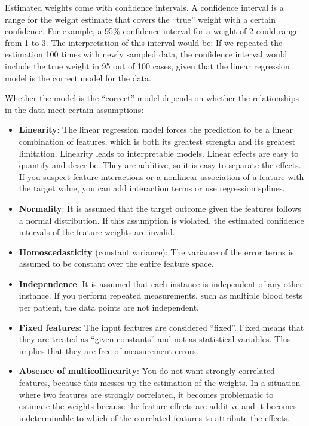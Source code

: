 Estimated weights come with confidence intervals. A confidence interval is a range for the weight estimate that covers the “true” weight with a certain confidence. For example, a 95\% confidence interval for a weight of 
2 could range from 1 to 3. The interpretation of this interval would be: If we repeated the estimation 100 times with newly sampled data, the confidence interval would include the true weight in 95 out of 100 cases, given 
that the linear regression model is the correct model for the data.

Whether the model is the “correct” model depends on whether the relationships in the data meet certain assumptions:
\begin{itemize}
    \item \textbf{Linearity}: The linear regression model forces the
    prediction to be a linear combination of features, which is both its
    greatest strength and its greatest limitation. Linearity leads to
    interpretable models. Linear effects are easy to quantify and describe. They
    are additive, so it is easy to separate the effects. If you suspect feature
    interactions or a nonlinear association of a feature with the target value,
    you can add interaction terms or use regression splines.
    \item \textbf{Normality}: It is assumed that the target outcome given the features follows a normal distribution. If this assumption is violated, the estimated confidence intervals of the feature weights are invalid.
    \item \textbf{Homoscedasticity} (constant variance): The variance of the error terms is assumed to be constant over the entire feature space.
    \item \textbf{Independence}: It is assumed that each instance is independent of any other instance. If you perform repeated measurements, such as multiple blood tests per patient, the data points are not independent.
    \item \textbf{Fixed features}: The input features are considered “fixed”. Fixed means that they are treated as “given constants” and not as statistical variables. This implies that they are free of measurement errors.
    \item \textbf{Absence of multicollinearity}: You do not want strongly correlated features, because this messes up the estimation of the weights. In a situation where two features are strongly correlated, it becomes problematic to estimate the weights because the feature effects are additive and it becomes indeterminable to which of the correlated features to attribute the effects.
\end{itemize}

